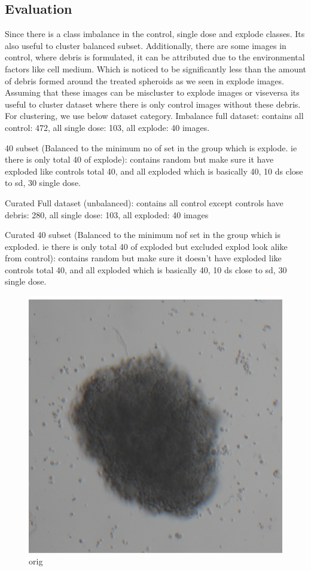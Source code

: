 \subsection{Evaluation}
Since there is a class imbalance in the control, single dose and explode classes. Its also useful to cluster balanced subset. Additionally, there are some images in control, where debris is formulated, it can be attributed due to the environmental factors like cell medium. Which is noticed to be significantly less than the amount of debris formed around the treated spheroids as we seen in explode images. Assuming that these images can be miscluster to explode images or viseversa its useful to cluster  dataset where there is only control images without these debris.
For clustering, we use below dataset category.
Imbalance full dataset: contains all control: 472, all single dose: 103, all explode: 40 images.

40 subset (Balanced to the minimum no of set in the group which is explode. ie there is only total 40 of explode): contains random but make sure it have exploded like 
controls total 40, and all exploded which is basically 40, 10 ds close to sd, 30 single dose.

Curated Full dataset (unbalanced): contains all control except controls have debris: 280, all single dose: 103, all exploded: 40 images

Curated 40 subset  (Balanced to the minimum nof set in the group which is exploded. ie there is only total 40 of exploded but excluded explod look alike from control):
contains random but make sure it doesn't have exploded like controls total 40, and all exploded which is basically 40, 10 ds close to sd, 30 single dose.

\begin{figure}[H]
    \centering
    \includegraphics[scale=0.25]{figures/controlex.png} 
    \caption{orig}
    \label{fig:controlex.png}
\end{figure}

